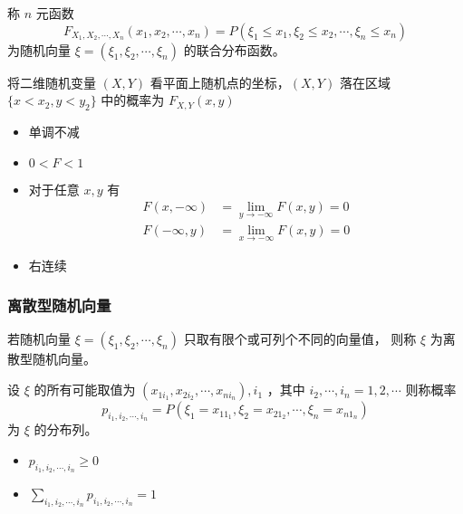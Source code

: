  称 $ n $ 元函数
$$ F_{X_1 , X_2 , \cdots , X_n }(x_{1} , x_{2} , \cdots , x_{n}) = P(\xi_{1} \leqslant x_1 , \xi_{2} \leqslant x_2 , \cdots , \xi_{n} \leqslant x_n ) $$
为随机向量 $ \xi = (\xi_1, \xi_2, \cdots, \xi_n) $ 的联合分布函数。

将二维随机变量 $ (X,Y) $ 看平面上随机点的坐标，$ (X,Y) $ 落在区域 $ \{ x < x_2, y < y_2 \} $ 中的概率为 $ F_{X,Y}(x,y) $

\begin{itemize}[leftmargin=\subparitemindent]
    \item 单调不减
    \item $ 0 < F < 1 $
    \item 对于任意 $ x,y $ 有 \begin{align}
        F(x, -\infty) & = \lim_{y \rightarrow -\infty} F(x,y) = 0 \\
        F(-\infty, y) & = \lim_{x \rightarrow -\infty} F(x,y) = 0
    \end{align}
    \item 右连续
\end{itemize}

\subsubsection{离散型随机向量}

 若随机向量 $ \xi = (\xi_{1} , \xi_{2} , \cdots , \xi_{n}) $ 只取有限个或可列个不同的向量值，
则称 $ \xi $ 为离散型随机向量。

 设 $ \xi $ 的所有可能取值为 $ (x_{1i_1} , x_{2i_2} , \cdots , x_{ni_n} ), i_{1} $ ，其中 $ i_{2} , \cdots , i_{n} = 1,2,\cdots $
则称概率
\begin{equation}
    p_{i_{1} , i_{2} , \cdots , i_{n} } = P(\xi_{1} = x_{11_{1}} , \xi_{2} = x_{21_{2}} , \cdots , \xi_{n} = x_{n1_{n}} ) 
\end{equation}
为 $ \xi $ 的分布列。

\begin{itemize}[leftmargin=\subparitemindent]
    \item $ p_{i_{1} , i_{2} , \cdots , i_{n} } \geqslant 0 $
    \item $ \sum_{i_{1} , i_{2} , \cdots , i_{n} } p_{i_{1} , i_{2} , \cdots , i_{n} } = 1 $
\end{itemize}

